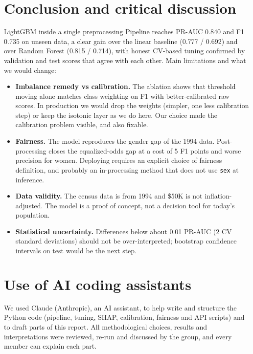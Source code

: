 \documentclass[10.5pt,a4paper]{article}
\newcommand{\code}[1]{\texttt{\small #1}}
\begin{document}
\section{Conclusion and critical discussion}
\label{sec:conclusion}
LightGBM inside a single preprocessing Pipeline reaches PR-AUC 0.840 and F1 0.735 on unseen data, a clear
gain over the linear baseline (0.777 / 0.692) and over Random Forest (0.815 / 0.714), with honest
CV-based tuning confirmed by validation and test scores that agree with each other. Main limitations and what
we would change:
\begin{itemize}
  \item \textbf{Imbalance remedy vs calibration.} The ablation shows that threshold moving alone matches class
  weighting on F1 with better-calibrated raw scores. In production we would drop the weights (simpler, one
  less calibration step) or keep the isotonic layer as we do here. Our choice made the calibration problem
  visible, and also fixable.
  \item \textbf{Fairness.} The model reproduces the gender gap of the 1994 data. Post-processing closes the
  equalized-odds gap at a cost of 5 F1 points and worse precision for women. Deploying requires an explicit
  choice of fairness definition, and probably an in-processing method that does not use \code{sex} at
  inference.
  \item \textbf{Data validity.} The census data is from 1994 and \$50K is not inflation-adjusted. The model is a
  proof of concept, not a decision tool for today's population.
  \item \textbf{Statistical uncertainty.} Differences below about 0.01 PR-AUC (2 CV standard deviations) should
  not be over-interpreted; bootstrap confidence intervals on test would be the next step.
\end{itemize}

\section*{Use of AI coding assistants}
We used Claude (Anthropic), an AI assistant, to help write and structure the Python code (pipeline,
tuning, SHAP, calibration, fairness and API scripts) and to draft parts of this report. All
methodological choices, results and interpretations were reviewed, re-run and discussed by the group, and
every member can explain each part.
\end{document}
